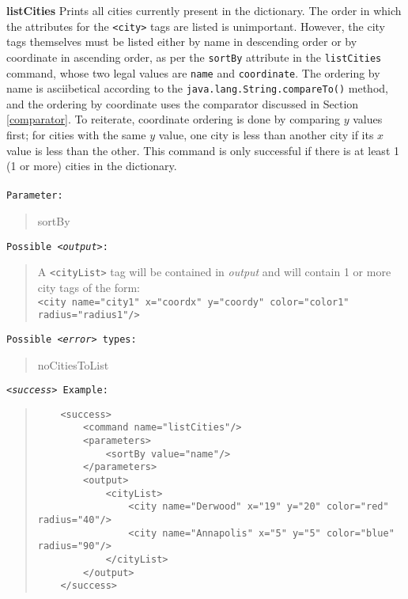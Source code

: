 \documentclass[12pt]{article}
\newenvironment{Description}
   {\begin{list}{}{\let\makelabel\Descriptionlabel
      \setlength\leftmargin{\labelwidth+\labelsep}
      \setlength\itemindent{-0.3em}}}%
   {\end{list}}
\newcommand*{\Descriptionlabel}[1]{%
  \parbox[b]{\labelwidth}
  {\makebox[0pt][l]{\textbf{#1}}\\}
  \hfill}
\begin{document}
\begin{Description}
\begin{Description}


	\item[\textbf{listCities}]
	Prints all cities currently present
  	in the dictionary.   The order in which the attributes for the \texttt{<city>} tags are
 	listed is unimportant.  However, the city tags themselves must be
  	listed either by name in descending  order  or by coordinate in
        ascending order, as per
  	the \texttt{sortBy} attribute in the \texttt{listCities} command,
 	whose two legal values are \texttt{name} and \texttt{coordinate}.
  	The ordering by name is asciibetical according to the
  	\texttt{java.lang.String.compareTo()} method, and the ordering by
  	coordinate uses the comparator  discussed in Section \ref{comparator}.  To reiterate,
  	coordinate ordering is done by comparing $y$ values first; for cities
  	with the same $y$ value, one city is less than another city if its $x$
  	value is less than the other.  This command is only successful if there is at least
  	1 (1 or more) cities in the dictionary.\\\\ 	  %
	\texttt{Parameter:}
	\begin{quote}
		sortBy
	\end{quote}
	\texttt{Possible \emph{<output>}:}
	\begin{quote}
		A \texttt{<cityList>} tag will be contained in \emph{output} and will contain 1 or more
		city tags of the form:\\
		\texttt{<city name="city1" x="coordx" y="coordy" color="color1" radius="radius1"/>}
	\end{quote}
	\texttt{Possible \emph{<error>} types:}
	\begin{quote}
		noCitiesToList
	\end{quote}
	\texttt{\emph{<success>} Example:}
	\begin{quote}
	\begin{verbatim}
	<success>
	    <command name="listCities"/>
	    <parameters>
	        <sortBy value="name"/>
	    </parameters>
	    <output>
	        <cityList>
	            <city name="Derwood" x="19" y="20" color="red" radius="40"/>
	            <city name="Annapolis" x="5" y="5" color="blue" radius="90"/>
	        </cityList>
	    </output>
	</success>
	\end{verbatim}
	\end{quote}
	

\end{Description}
\end{Description}
\end{document}
